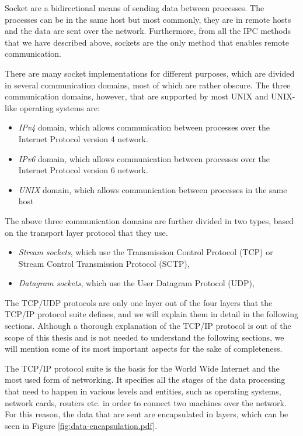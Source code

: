 Socket are a bidirectional means of sending data between processes. The 
processes can be in the same host but most commonly, they are in remote hosts 
and the data are sent over the network. Furthermore, from all the IPC methods 
that we have described above, sockets are the only method that enables remote 
communication. 

There are many socket implementations for different purposes, which are divided 
in several communication domains, most of which are rather obscure. The three 
communication domains, however, that are supported by most UNIX and UNIX-like 
operating systems are:

\begin{itemize}
	\item \textit{IPv4} domain, which allows communication between 
		processes over the Internet Protocol version 4 network.
	\item \textit{IPv6} domain, which allows communication between 
		processes over the Internet Protocol version 6 network.
	\item \textit{UNIX} domain, which allows communication between 
		processes in the same host
\end{itemize}

The above three communication domains are further divided in two types, based 
on the transport layer protocol that they use.

\begin{itemize}
	\item \textit{Stream sockets}, which use the Transmission Control 
		Protocol (TCP) or Stream Control Transmission Protocol (SCTP),
	\item \textit{Datagram sockets}, which use the User Datagram Protocol 
		(UDP),
\end{itemize}

The TCP/UDP protocols are only one layer out of the four layers that the TCP/IP 
protocol suite defines, and we will explain them in detail in the following 
sections. Although a thorough explanation of the TCP/IP protocol is out of the 
scope of this thesis and is not needed to understand the following sections, we 
will mention some of its most important aspects for the sake of completeness.

The TCP/IP protocol suite is the basis for the World Wide Internet and the most 
used form of networking. It specifies all the stages of the data processing 
that need to happen in various levels and entities, such as operating systems, 
network cards, routers etc. in order to connect two machines over the network.  
For this reason, the data that are sent are encapsulated in layers, which can 
be seen in Figure \ref{fig:data-encapsulation.pdf}.

